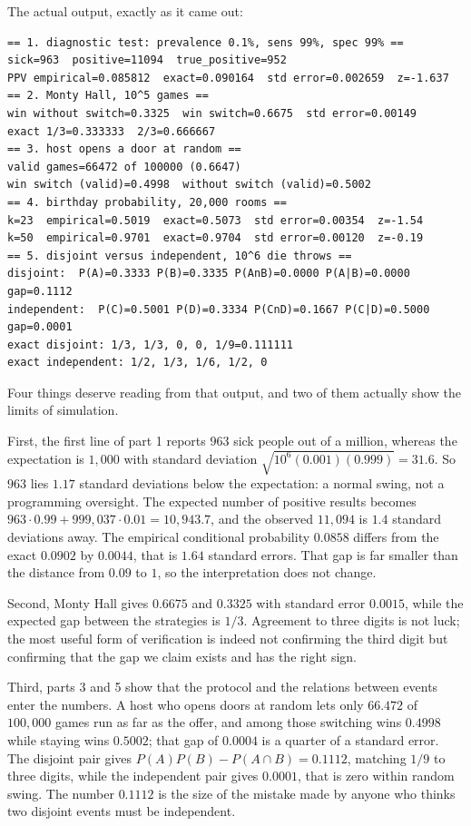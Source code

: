 The actual output, exactly as it came out:

\begin{verbatim}
== 1. diagnostic test: prevalence 0.1%, sens 99%, spec 99% ==
sick=963  positive=11094  true_positive=952
PPV empirical=0.085812  exact=0.090164  std error=0.002659  z=-1.637
== 2. Monty Hall, 10^5 games ==
win without switch=0.3325  win switch=0.6675  std error=0.00149
exact 1/3=0.333333  2/3=0.666667
== 3. host opens a door at random ==
valid games=66472 of 100000 (0.6647)
win switch (valid)=0.4998  without switch (valid)=0.5002
== 4. birthday probability, 20,000 rooms ==
k=23  empirical=0.5019  exact=0.5073  std error=0.00354  z=-1.54
k=50  empirical=0.9701  exact=0.9704  std error=0.00120  z=-0.19
== 5. disjoint versus independent, 10^6 die throws ==
disjoint:  P(A)=0.3333 P(B)=0.3335 P(AnB)=0.0000 P(A|B)=0.0000 gap=0.1112
independent:  P(C)=0.5001 P(D)=0.3334 P(CnD)=0.1667 P(C|D)=0.5000 gap=0.0001
exact disjoint: 1/3, 1/3, 0, 0, 1/9=0.111111
exact independent: 1/2, 1/3, 1/6, 1/2, 0
\end{verbatim}    

Four things deserve reading from that output, and two of them actually show the limits of
simulation.

First, the first line of part 1 reports $963$ sick people out of a million, whereas the
expectation is $1{,}000$ with standard deviation $\sqrt{10^{6}(0.001)(0.999)}=31.6$. So
$963$ lies $1.17$ standard deviations below the expectation: a normal swing, not a
programming oversight. The expected number of positive results becomes
$963\cdot 0.99+999{,}037\cdot 0.01=10{,}943.7$,
and the observed $11{,}094$ is $1.4$ standard deviations away. The empirical conditional
probability $0.0858$ differs from the exact $0.0902$ by $0.0044$, that is $1.64$ standard
errors. That gap is far smaller than the distance from $0.09$ to $1$, so the interpretation
does not change.

Second, Monty Hall gives $0.6675$ and $0.3325$ with standard error $0.0015$, while the
expected gap between the strategies is $1/3$. Agreement to three digits is not luck; the
most useful form of verification is indeed not confirming the third digit but confirming
that the gap we claim exists and has the right sign.

Third, parts 3 and 5 show that the protocol and the relations between events enter the
numbers. A host who opens doors at random lets only $66.472$ of
$100{,}000$ games run as far as the offer, and among those switching wins
$0.4998$ while staying wins $0.5002$; that gap of $0.0004$ is a quarter of a standard error.
The disjoint pair gives $P(A)P(B)-P(A\cap B)=0.1112$, matching $1/9$ to
three digits, while the independent pair gives $0.0001$, that is zero within random swing.
The number $0.1112$ is the size of the mistake made by anyone who thinks two disjoint events
must be independent.

